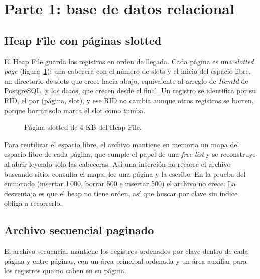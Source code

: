 \documentclass[11pt,a4paper]{article}
\begin{document}
\section{Parte 1: base de datos relacional}

\subsection{Heap File con páginas slotted}

El Heap File guarda los registros en orden de llegada. Cada página es una \emph{slotted page} (figura~\ref{fig:slotted}): una cabecera con el número de slots y el inicio del espacio libre, un directorio de slots que crece hacia abajo, equivalente al arreglo de \emph{ItemId} de PostgreSQL, y los datos, que crecen desde el final. Un registro se identifica por su RID, el par (página, slot), y ese RID no cambia aunque otros registros se borren, porque borrar solo marca el slot como tumba.

\begin{figure}[!htbp]
\centering

\caption{Página slotted de 4 KB del Heap File.}
\label{fig:slotted}
\end{figure}

Para reutilizar el espacio libre, el archivo mantiene en memoria un mapa del espacio libre de cada página, que cumple el papel de una \emph{free list} y se reconstruye al abrir leyendo solo las cabeceras. Así una inserción no recorre el archivo buscando sitio: consulta el mapa, lee una página y la escribe. En la prueba del enunciado (insertar 1\,000, borrar 500 e insertar 500) el archivo no crece. La desventaja es que el heap no tiene orden, así que buscar por clave sin índice obliga a recorrerlo.

\subsection{Archivo secuencial paginado}

El archivo secuencial mantiene los registros ordenados por clave dentro de cada página y entre páginas, con un área principal ordenada y un área auxiliar para los registros que no caben en su página.
\end{document}
